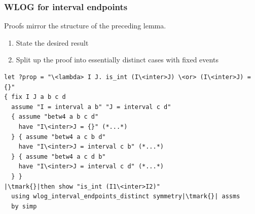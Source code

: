 \documentclass[12pt,notheorems,aspectratio=169,notes,handout]{beamer}
\begin{document}
\begin{frame}[fragile]\frametitle{WLOG for interval endpoints}
	Proofs mirror the structure of the preceding lemma.
	\begin{enumerate}
	\item<2> State the desired result
	\item<3> Split up the proof into essentially distinct cases with fixed events
	\end{enumerate}
		{\lstset{escapeinside=||}
\begin{lstlisting}
let ?prop = "\<lambda> I J. is_int (I\<inter>J) \<or> (I\<inter>J) = {}"
{ fix I J a b c d
  assume "I = interval a b" "J = interval c d"
  { assume "betw4 a b c d"
    have "I\<inter>J = {}" (*...*)
  } { assume "betw4 a c b d"
    have "I\<inter>J = interval c b" (*...*)
  } { assume "betw4 a c d b"
    have "I\<inter>J = interval c d" (*...*)
  } }
|\tmark{}|then show "is_int (I1\<inter>I2)"
  using wlog_interval_endpoints_distinct symmetry|\tmark{}| assms
  by simp
\end{lstlisting}}

\end{frame}
\end{document}
